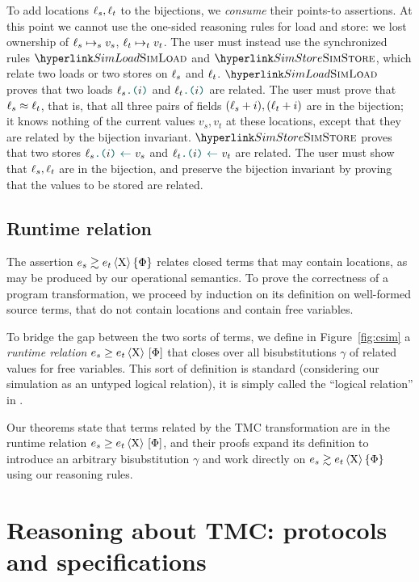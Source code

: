 To add locations $\ell_s, \ell_t$ to the bijections, we \emph{consume} their points-to assertions. At this point we cannot use the one-sided reasoning rules for load and store: we lost ownership of $\ell_s \mapsto_s v_s$, $\ell_t \mapsto_t v_t$.
%
The user must instead use the synchronized rules $\RefTirName{SimLoad}$ and $\RefTirName{SimStore}$, which relate two loads or two stores on $\ell_s$ and $\ell_t$.
%
$\RefTirName{SimLoad}$ proves that two loads $\lambdLoad{\loc_s}{i}$ and $\lambdLoad{\loc_t}{i}$ are related. The user must prove that $\ell_s \approx \ell_t$, that is, that all three pairs of fields $(\ell_s + i), (\ell_t + i)$ are in the bijection; it knows nothing of the current values $v_s, v_t$ at these locations, except that they are related by the bijection invariant.
%
$\RefTirName{SimStore}$ proves that two stores $\lambdStore{\loc_s}{i}{v_s}$ and $\lambdStore{\loc_t}{i}{v_t}$ are related. The user must show that $\ell_s, \ell_t$ are in the bijection, and preserve the bijection invariant by proving that the values to be stored are related.

\subsection{Runtime relation}



The assertion $\iSim[\Chi]{\Phi}{e_s}{e_t}$ relates closed terms that may contain locations, as may be produced by our operational semantics. To prove the correctness of a program transformation, we proceed by induction on its definition on well-formed source terms, that do not contain locations and contain free variables.

To bridge the gap between the two sorts of terms, we define in Figure~\ref{fig:csim} a \emph{runtime relation} $\iCsimv[\Chi]{\Phi}{e_s}{e_t}$ that closes over all bisubstitutions $\gamma$ of related values for free variables. This sort of definition is standard (considering our simulation as an untyped logical relation), it is simply called the ``logical relation'' in \Simuliris.

Our theorems state that terms related by the TMC transformation are in the runtime relation $\iCsimv[\Chi]{\Phi}{e_s}{e_t}$, and their proofs expand its definition to introduce an arbitrary bisubstitution $\gamma$ and work directly on $\iSim[\Chi]{\Phi}{e_s}{e_t}$ using our reasoning rules.

\section{Reasoning about TMC: protocols and specifications}
\label{sec:TMC_protocols_and_specs}


